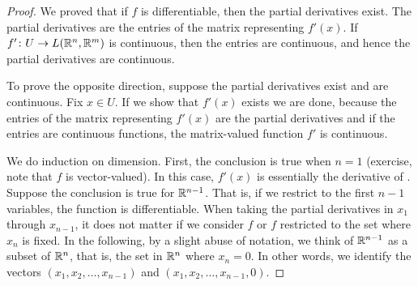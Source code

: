 \begin{proof}
We proved that if $f$ is differentiable, then
the partial derivatives exist.  The partial
derivatives are the entries of the matrix representing $f'(x)$.  If
$f' \colon U \to L({\mathbb{R}}^n,{\mathbb{R}}^m)$ is continuous, then the entries are
continuous, and hence the partial derivatives are continuous.

To prove the opposite direction,
suppose the partial derivatives exist and are continuous.
Fix $x \in U$.  If we show that $f'(x)$ exists we are done, because
the entries of the matrix representing $f'(x)$ are the partial
derivatives and if the entries are continuous functions,
the matrix-valued function $f'$ is continuous.

We do induction on dimension.  First,
the conclusion is true when $n=1$
(exercise, note that $f$ is vector-valued).
In this case, $f'(x)$ is essentially the derivative of
.
Suppose the conclusion is true for ${\mathbb{R}}^{n-1}$.
That is,
if we restrict to the first $n-1$ variables, the function is differentiable.
When taking the partial derivatives in $x_1$ through $x_{n-1}$,
it does not matter if we consider $f$ or $f$ restricted to the set where
$x_n$ is fixed.
In the following, by a slight abuse of notation,
we think of ${\mathbb{R}}^{n-1}$ as a subset of ${\mathbb{R}}^n$, that is, the set in ${\mathbb{R}}^n$ where $x_n = 0$.
In other words, we identify the vectors $(x_1,x_2,\ldots,x_{n-1})$ and
$(x_1,x_2,\ldots,x_{n-1},0)$.


\end{proof}
